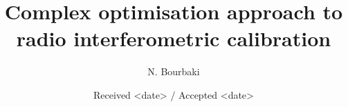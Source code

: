 \documentclass[]{aa}
\begin{document}
      
	      
\title{Complex optimisation approach to radio interferometric calibration}

\subtitle{}
\author{N. Bourbaki}%

\date{Received <date> / Accepted <date>}


\abstract{
}




   \maketitle
























\end{document}
